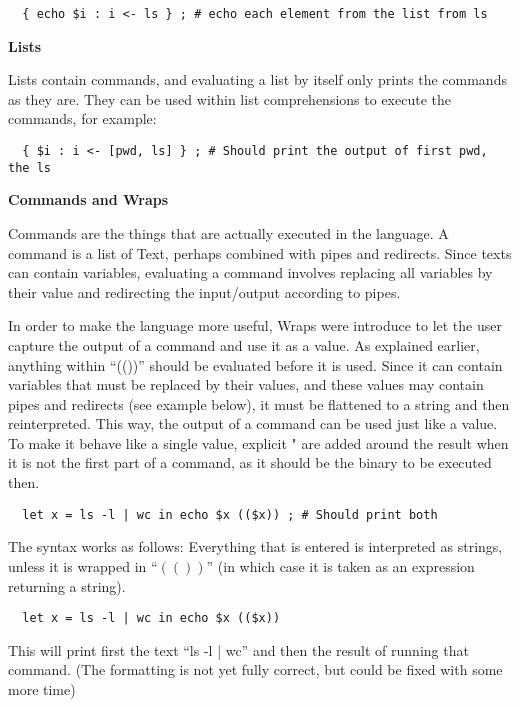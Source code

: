\documentclass[11pt,a4paper]{article}
\begin{document}
\begin{verbatim}
  { echo $i : i <- ls } ; # echo each element from the list from ls
\end{verbatim}

\textbf{Lists}

Lists contain commands, and evaluating a list by itself only prints the
commands as they are. They can be used within list comprehensions to execute
the commands, for example:

\begin{verbatim}
  { $i : i <- [pwd, ls] } ; # Should print the output of first pwd, the ls
\end{verbatim}

\textbf{Commands and Wraps}

Commands are the things that are actually executed in the language. A command
is a list of Text, perhaps combined with pipes and redirects. Since texts can
contain variables, evaluating a command involves replacing all variables by
their value and redirecting the input/output according to pipes.

In order to make the language more useful, Wraps were introduce to let the user
capture the output of a command and use it as a value. As explained earlier,
anything within ``(())'' should be evaluated before it is used. Since it can
contain variables that must be replaced by their values, and these values may
contain pipes and redirects (see example below), it must be flattened to a
string and then reinterpreted. This way, the output of a command can be used
just like a value. To make it behave like a single value, explicit " are added
around the result when it is not the first part of a command, as it should be
the binary to be executed then.

\begin{verbatim}
  let x = ls -l | wc in echo $x (($x)) ; # Should print both
\end{verbatim}




The syntax works as follows: Everything that is entered is interpreted as
strings, unless it is wrapped in ``$\left( \left(  \right) \right)$'' (in which
case it is taken as an expression returning a string).

\begin{verbatim}
  let x = ls -l | wc in echo $x (($x))
\end{verbatim}

This will print first the text ``ls -l | wc'' and then the result of running
that command. (The formatting is not yet fully correct, but could be fixed with
some more time)
\end{document}

